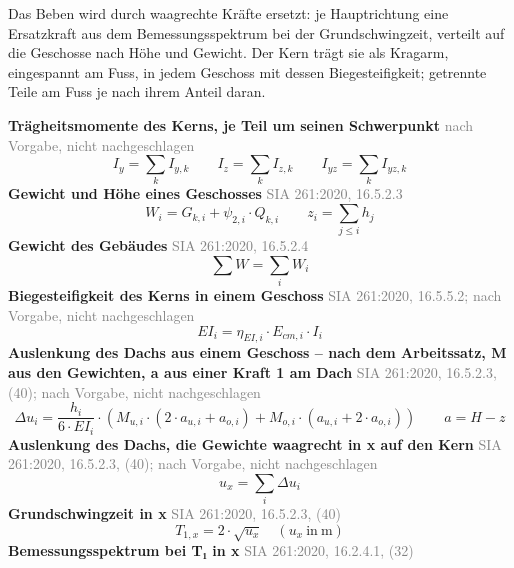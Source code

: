 \documentclass[11pt,a4paper]{article}
\newcommand{\normref}[1]{{\small\textcolor{gray}{#1}}}
\begin{document}
Das Beben wird durch waagrechte Kräfte ersetzt: je Hauptrichtung eine Ersatzkraft aus dem Bemessungsspektrum bei der Grundschwingzeit, verteilt auf die Geschosse nach Höhe und Gewicht. Der Kern trägt sie als Kragarm, eingespannt am Fuss, in jedem Geschoss mit dessen Biegesteifigkeit; getrennte Teile am Fuss je nach ihrem Anteil daran.

\noindent\textbf{Trägheitsmomente des Kerns, je Teil um seinen Schwerpunkt} \hfill \normref{nach Vorgabe, nicht nachgeschlagen}
\begin{equation*}
I_y = \sum_k I_{y,k} \qquad I_z = \sum_k I_{z,k} \qquad I_{yz} = \sum_k I_{yz,k}
\end{equation*}
\noindent\textbf{Gewicht und Höhe eines Geschosses} \hfill \normref{SIA 261:2020, 16.5.2.3}
\begin{equation*}
W_i = G_{k,i} + \psi_{2,i} \cdot Q_{k,i} \qquad z_i = \sum_{j \le i} h_j
\end{equation*}
\noindent\textbf{Gewicht des Gebäudes} \hfill \normref{SIA 261:2020, 16.5.2.4}
\begin{equation*}
\sum W = \sum_i W_i
\end{equation*}
\noindent\textbf{Biegesteifigkeit des Kerns in einem Geschoss} \hfill \normref{SIA 261:2020, 16.5.5.2; nach Vorgabe, nicht nachgeschlagen}
\begin{equation*}
EI_i = \eta_{EI,i} \cdot E_{cm,i} \cdot I_i
\end{equation*}
\noindent\textbf{Auslenkung des Dachs aus einem Geschoss – nach dem Arbeitssatz, M aus den Gewichten, a aus einer Kraft 1 am Dach} \hfill \normref{SIA 261:2020, 16.5.2.3, (40); nach Vorgabe, nicht nachgeschlagen}
\begin{equation*}
\Delta u_i = \frac{h_i}{6 \cdot EI_i} \cdot \left(M_{u,i} \cdot (2 \cdot a_{u,i} + a_{o,i}) + M_{o,i} \cdot (a_{u,i} + 2 \cdot a_{o,i})\right) \qquad a = H - z
\end{equation*}
\noindent\textbf{Auslenkung des Dachs, die Gewichte waagrecht in x auf den Kern} \hfill \normref{SIA 261:2020, 16.5.2.3, (40); nach Vorgabe, nicht nachgeschlagen}
\begin{equation*}
u_x = \sum_i \Delta u_i
\end{equation*}
\noindent\textbf{Grundschwingzeit in x} \hfill \normref{SIA 261:2020, 16.5.2.3, (40)}
\begin{equation*}
T_{1,x} = 2 \cdot \sqrt{u_x} \quad \left(u_x\ \text{in}\ \mathrm{m}\right)
\end{equation*}
\noindent\textbf{Bemessungsspektrum bei T₁ in x} \hfill \normref{SIA 261:2020, 16.2.4.1, (32)}
\end{document}
